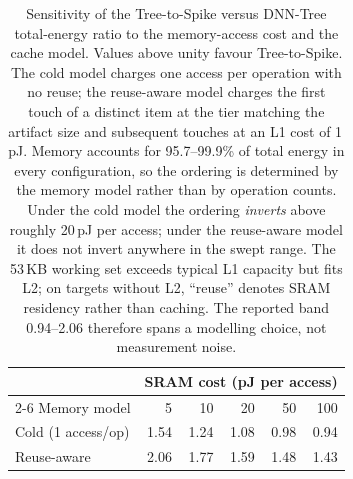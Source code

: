 \begin{table}[!t]
\centering
\caption{Sensitivity of the Tree-to-Spike versus DNN-Tree total-energy ratio to
the memory-access cost and the cache model. Values above unity favour
Tree-to-Spike. The cold model charges one access per operation with no reuse; the
reuse-aware model charges the first touch of a distinct item at the tier matching
the artifact size and subsequent touches at an L1 cost of 1\,pJ. Memory accounts
for 95.7--99.9\% of total energy in every configuration, so the ordering is
determined by the memory model rather than by operation counts. Under the cold
model the ordering \emph{inverts} above roughly 20\,pJ per access; under the
reuse-aware model it does not invert anywhere in the swept range. The 53\,KB
working set exceeds typical L1 capacity but fits L2; on targets without L2,
``reuse'' denotes SRAM residency rather than caching. The reported band
0.94--2.06 therefore spans a modelling choice, not measurement noise.}
\label{tab:dep:sensitivity}
\small
\begin{tabular}{lrrrrr}
\toprule
 & \multicolumn{5}{c}{SRAM cost (pJ per access)} \\
\cmidrule(lr){2-6}
Memory model & 5 & 10 & 20 & 50 & 100 \\
\midrule
Cold (1 access/op) & 1.54 & 1.24 & 1.08 & 0.98 & 0.94 \\
Reuse-aware        & 2.06 & 1.77 & 1.59 & 1.48 & 1.43 \\
\bottomrule
\end{tabular}
\end{table}


